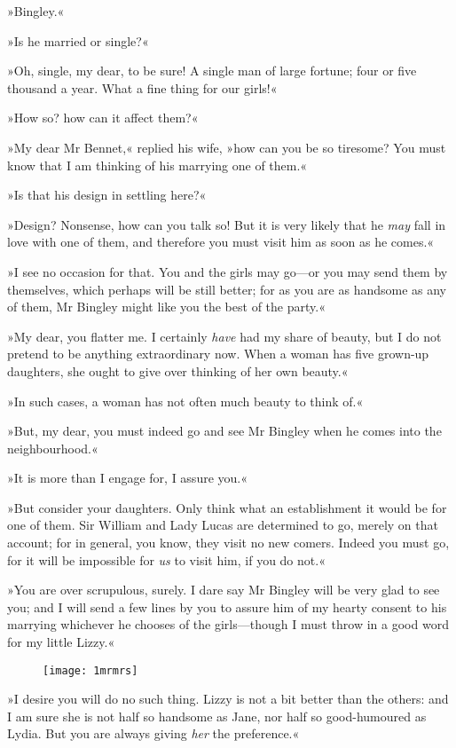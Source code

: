 »Bingley.«

»Is he married or single?«

»Oh, single, my dear, to be sure! A single man of large fortune; four or five thousand a year. What a fine thing for our girls!«

»How so? how can it affect them?«

»My dear Mr Bennet,« replied his wife, »how can you be so tiresome? You must know that I am thinking of his marrying one of them.«

»Is that his design in settling here?«

»Design? Nonsense, how can you talk so! But it is very likely that he \textit{may} fall in love with one of them, and therefore you must visit him as soon as he comes.«

»I see no occasion for that. You and the girls may go—or you may send them by themselves, which perhaps will be still better; for as you are as handsome as any of them, Mr Bingley might like you the best of the party.«

»My dear, you flatter me. I certainly \textit{have} had my share of beauty, but I do not pretend to be anything extraordinary now. When a woman has five grown-up daughters, she ought to give over thinking of her own beauty.«

»In such cases, a woman has not often much beauty to think of.«

»But, my dear, you must indeed go and see Mr Bingley when he comes into the neighbourhood.«

»It is more than I engage for, I assure you.«

»But consider your daughters. Only think what an establishment it would be for one of them. Sir William and Lady Lucas are determined to go, merely on that account; for in general, you know, they visit no new comers. Indeed you must go, for it will be impossible for \textit{us} to visit him, if you do not.«

»You are over scrupulous, surely. I dare say Mr Bingley will be very glad to see you; and I will send a few lines by you to assure him of my hearty consent to his marrying whichever he chooses of the girls—though I must throw in a good word for my little Lizzy.«

\begin{figure}[bh!]
\centering
\texttt{[image: 1mrmrs]}
\end{figure}

»I desire you will do no such thing. Lizzy is not a bit better than the others: and I am sure she is not half so handsome as Jane, nor half so good-humoured as Lydia. But you are always giving \textit{her} the preference.«

